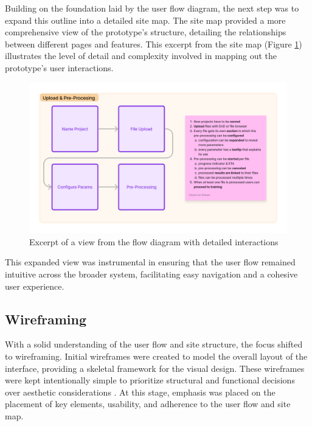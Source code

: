 Building on the foundation laid by the user flow diagram, the next step was to expand this outline into a detailed site map.
The site map provided a more comprehensive view of the prototype's structure, detailing the relationships between different pages and features.
This excerpt from the site map (Figure \ref{fig:design:flow-2}) illustrates the level of detail and complexity involved in mapping out the prototype's user interactions.

\begin{figure}[htb]
  \centering
  \includegraphics[width=.8\textwidth]{figures/flow-2.png}
  \caption{Excerpt of a view from the flow diagram with detailed interactions}
  \label{fig:design:flow-2}
\end{figure}

This expanded view was instrumental in ensuring that the user flow remained intuitive across the broader system, facilitating easy navigation and a cohesive user experience.

\subsection*{Wireframing}

With a solid understanding of the user flow and site structure, the focus shifted to wireframing.
Initial wireframes were created to model the overall layout of the interface, providing a skeletal framework for the visual design.
These wireframes were kept intentionally simple to prioritize structural and functional decisions over aesthetic considerations .
At this stage, emphasis was placed on the placement of key elements, usability, and adherence to the user flow and site map.

